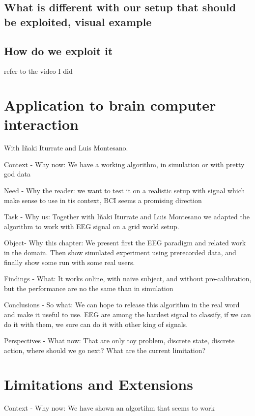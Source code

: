 \section{What is different with our setup that should be exploited, visual example}

\section{How do we exploit it}

refer to the video I did

\chapter{Application to brain computer interaction}
\minitoc

With I\~naki Iturrate and Luis Montesano.

Context - Why now: We have a working algorithm, in simulation or with pretty god data

Need - Why the reader: we want to test it on a realistic setup with signal which make sense to use in tis context, BCI seems a promising direction

Task - Why us: Together with I\~naki Iturrate and Luis Montesano we adapted the algorithm to work with EEG signal on a grid world setup.

Object- Why this chapter:  We present first the EEG paradigm and related work in the domain. Then show simulated experiment using prerecorded data, and finally show some run with some real users.

Findings - What: It works online, with naive subject, and without pre-calibration, but the performance are no the same than in simulation

Conclusions - So what: We can hope to release this algorithm in the real word and make it useful to use. EEG are among the hardest signal to classify, if we can do it with them, we sure can do it with other king of signals.

Perspectives - What now: That are only toy problem, discrete state, discrete action, where should we go next? What are the current limitation?

\chapter{Limitations and Extensions}
\minitoc

Context - Why now: We have shown an algortihm that seems to work

